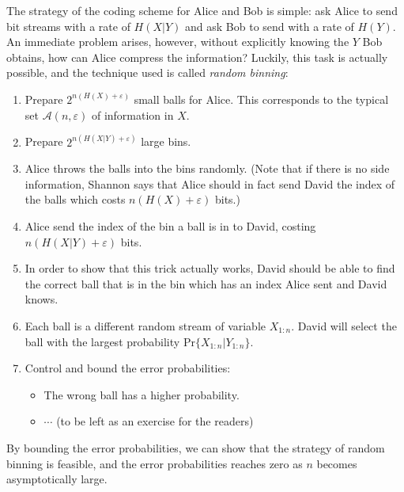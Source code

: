 The strategy of the coding scheme for Alice and Bob is simple: ask Alice to send bit streams with a rate of $H(X\vert Y)$ and ask Bob to send with a rate of $H(Y)$. An immediate problem arises, however, without explicitly knowing the $Y$ Bob obtains, how can Alice compress the information? Luckily, this task is actually possible, and the technique used is called \textit{random binning}:
\begin{enumerate}
    \item Prepare $2^{n(H(X)+\varepsilon)}$ small balls for Alice. This corresponds to the typical set $\mathcal{A}(n,\varepsilon)$ of information in $X$. 
    \item Prepare $2^{n(H(X\vert Y)+\varepsilon)}$ large bins.
    \item Alice throws the balls into the bins randomly. (Note that if there is no side information, Shannon says that Alice should in fact send David the index of the balls which costs $n(H(X)+\varepsilon)$ bits.)
    \item Alice send the index of the bin a ball is in to David, costing $n(H(X\vert Y) +\varepsilon)$ bits.
    \item In order to show that this trick actually works, David should be able to find the correct ball that is in the bin which has an index Alice sent and David knows.
    \item Each ball is a different random stream of variable $X_{1:n}$. David will select the ball with the largest probability $\mathrm{Pr}\{X_{1:n}\vert Y_{1:n}\}$.
    \item Control and bound the error probabilities:
    \begin{itemize}
        \item The wrong ball has a higher probability.
        \item $\cdots$ (to be left as an exercise for the readers)
    \end{itemize}
\end{enumerate}
By bounding the error probabilities, we can show that the strategy of random binning is feasible, and the error probabilities reaches zero as $n$ becomes asymptotically large.
